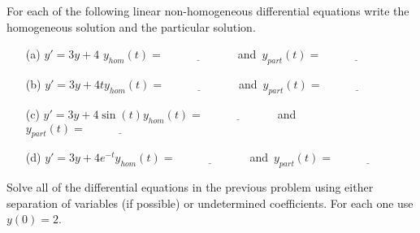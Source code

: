 \begin{problem}\label{prob:undet_coeff}
    For each of the following linear non-homogeneous differential equations write the homogeneous solution and the particular solution. 
    \begin{enumerate}
        \item[(a)] $y' = 3y + 4$ \qquad $y_{hom}(t) = \underline{\hspace{1in}}$\, and\, $y_{part}(t) = \underline{\hspace{1in}}$
        \item[(b)] $y' = 3y + 4t$\qquad $y_{hom}(t) = \underline{\hspace{1in}}$\, and\, $y_{part}(t) = \underline{\hspace{1in}}$
        \item[(c)] $y' = 3y + 4\sin(t)$\qquad $y_{hom}(t) = \underline{\hspace{1in}}$\,
            and\, $y_{part}(t) = \underline{\hspace{1in}}$
        \item[(d)] $y' = 3y + 4e^{-t}$\qquad $y_{hom}(t) = \underline{\hspace{1in}}$\,
            and\, $y_{part}(t) = \underline{\hspace{1in}}$
    \end{enumerate}
\end{problem}


\begin{problem}
    Solve all of the differential equations in the previous problem using either
    separation of variables (if possible) or undetermined coefficients. For each one use
    $y(0) = 2$.
\end{problem}


